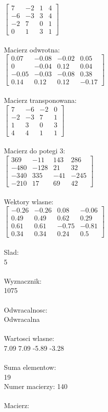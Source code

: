 \documentclass[a4paper,12pt]{article}
\begin{document}
$\begin{bmatrix} 7&-2&1&4\\-6&-3&3&4\\-2&7&0&1\\0&1&3&1 \end{bmatrix}$
\\
\\
Macierz odwrotna:\\

$\begin{bmatrix} 0.07&-0.08&-0.02&0.05\\0&-0.04&0.12&0.04\\-0.05&-0.03&-0.08&0.38\\0.14&0.12&0.12&-0.17 \end{bmatrix}$
\\
\\
Macierz transponowana:\\

$\begin{bmatrix} 7&-6&-2&0\\-2&-3&7&1\\1&3&0&3\\4&4&1&1 \end{bmatrix}$
\\
\\
Macierz do potegi 3:\\

$\begin{bmatrix} 369&-11&143&286\\-480&-128&21&32\\-340&335&-41&-245\\-210&17&69&42 \end{bmatrix}$
\\
\\
Wektory wlasne:\\

$\begin{bmatrix} -0.26&-0.26&0.08&-0.06\\0.49&0.49&0.62&0.29\\0.61&0.61&-0.75&-0.81\\0.34&0.34&0.24&0.5 \end{bmatrix}$
\\
\\
Slad:\\
5
\\
\\
Wyznacznik:\\
1075
\\
\\
Odwracalnosc:\\
Odwracalna
\\
\\
Wartosci wlasne:\\
7.09 7.09 -5.89 -3.28
\\
\\
Suma elementow:\\
19
\\
\newpage
Numer macierzy:
140
\\
\\
Macierz:\\
\end{document}
